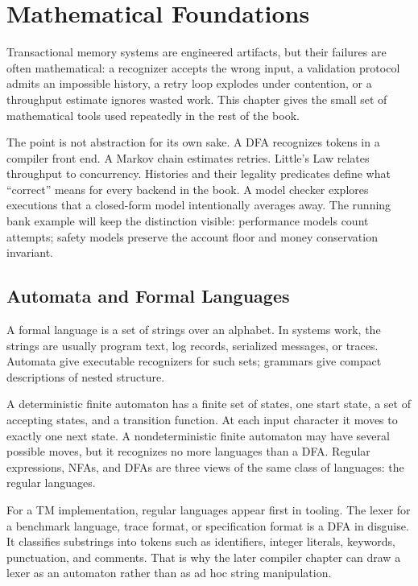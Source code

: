 \chapter{Mathematical Foundations}

Transactional memory systems are engineered artifacts, but their failures are often mathematical: a recognizer accepts the wrong input, a validation protocol admits an impossible history, a retry loop explodes under contention, or a throughput estimate ignores wasted work. This chapter gives the small set of mathematical tools used repeatedly in the rest of the book.

The point is not abstraction for its own sake. A DFA recognizes tokens in a compiler front end. A Markov chain estimates retries. Little's Law relates throughput to concurrency. Histories and their legality predicates define what ``correct'' means for every backend in the book. A model checker explores executions that a closed-form model intentionally averages away. The running bank example will keep the distinction visible: performance models count attempts; safety models preserve the account floor and money conservation invariant.

\section{Automata and Formal Languages}

A formal language is a set of strings over an alphabet. In systems work, the strings are usually program text, log records, serialized messages, or traces. Automata give executable recognizers for such sets; grammars give compact descriptions of nested structure.

A deterministic finite automaton has a finite set of states, one start state, a set of accepting states, and a transition function. At each input character it moves to exactly one next state. A nondeterministic finite automaton may have several possible moves, but it recognizes no more languages than a DFA. Regular expressions, NFAs, and DFAs are three views of the same class of languages: the regular languages.

For a TM implementation, regular languages appear first in tooling. The lexer for a benchmark language, trace format, or specification format is a DFA in disguise. It classifies substrings into tokens such as identifiers, integer literals, keywords, punctuation, and comments. That is why the later compiler chapter can draw a lexer as an automaton rather than as ad hoc string manipulation.

